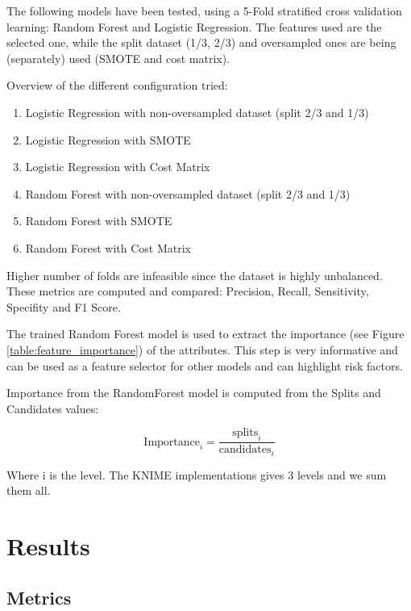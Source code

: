 The following models have been tested, using a 5-Fold stratified cross validation learning: Random Forest and Logistic Regression. The features used are the selected one, while the split dataset (1/3, 2/3) and oversampled ones are being (separately) used (SMOTE and cost matrix).

Overview of the different configuration tried:
\begin{enumerate}
    \item Logistic Regression with non-oversampled dataset (split 2/3 and 1/3)
    \item Logistic Regression with SMOTE
    \item Logistic Regression with Cost Matrix
    \item Random Forest with non-oversampled dataset (split 2/3 and 1/3)
    \item Random Forest with SMOTE
    \item Random Forest with Cost Matrix
    \end{enumerate}

Higher number of folds are infeasible since the dataset is highly unbalanced. These metrics are computed and compared: Precision, Recall, Sensitivity, Specifity and F1 Score.

The trained Random Forest model is used to extract the importance (see Figure \ref{table:feature_importance}) of the attributes. This step is very informative and can be used as a feature selector for other models and can highlight risk factors.

Importance from the RandomForest model is computed from the Splits and Candidates values:

$$\text{Importance}_i = \frac{\text{splits}_i}{\text{candidates}_i} $$

Where i is the level. The KNIME implementations gives 3 levels and we sum them all.

\section{Results}

\subsection{Metrics}

